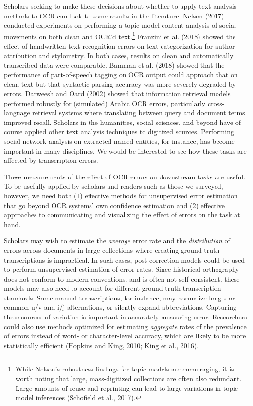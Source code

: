 \documentclass[twoside,11pt]{report}
\begin{document}
Scholars seeking to make these decisions about whether to apply text analysis methods to OCR can look to some results in the literature. Nelson (2017) conducted experiments on performing a topic-model content analysis of social movements on both clean and OCR'd text.\footnote{While Nelson's robustness findings for topic models are encouraging, it is worth noting that large, mass-digitized collections are often also redundant. Large amounts of reuse and reprinting can lead to large variations in topic model inferences (Schofield et al., 2017).}  Franzini et al. (2018) showed the effect of handwritten text recognition errors on text categorization for author attribution and stylometry. In both cases, results on clean and automatically transcribed data were comparable. Bamman et al. (2018) showed that the performance of part-of-speech tagging on OCR output could approach that on clean text but that syntactic parsing accuracy was more severely degraded by errors. Darweesh and Oard (2002) showed that information retrieval models performed robustly for (simulated) Arabic OCR errors, particularly cross-language retrieval systems where translating between query and document terms improved recall. Scholars in the humanities, social sciences, and beyond have of course applied other text analysis techniques to digitized sources. Performing social network analysis on extracted named entities, for instance, has become important in many disciplines. We would be interested to see how these tasks are affected by transcription errors.

These measurements of the effect of OCR errors on downstream tasks are useful. To be usefully applied by scholars and readers such as those we surveyed, however, we need both (1) effective methods for unsupervised error estimation that go beyond OCR systems' own confidence estimation and (2) effective approaches to communicating and visualizing the effect of errors on the task at hand.

Scholars may wish to estimate the \emph{average} error rate and the \emph{distribution} of errors across documents in large collections where creating ground-truth transcriptions is impractical. In such cases, post-correction models could be used to perform unsupervised estimation of error rates. Since historical orthography does not conform to modern conventions, and is often not self-consistent, these models may also need to account for different ground-truth transcription standards. Some manual transcriptions, for instance, may normalize long s or common u/v and i/j alternations, or silently expand abbreviations. Capturing these sources of variation is important in accurately measuring error. Researchers could also use methods optimized for estimating \emph{aggregate} rates of the prevalence of errors instead of word- or character-level accuracy, which are likely to be more statistically efficient (Hopkins and King, 2010; King et al., 2016).
\end{document}
